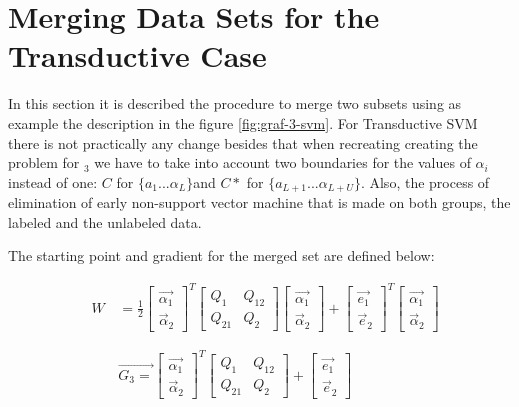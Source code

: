 \section{Merging Data Sets for the Transductive Case}

In this section it is described the procedure to merge two subsets
using as example the description in the figure \ref{fig:graf-3-svm}.
For Transductive SVM there is not practically any change besides that
when recreating creating the problem for $_{3}$ we have
to take into account two boundaries for the values of $\alpha_{i}$
instead of one: $C$ for $\{a_{1}...\alpha_{L}\}$and $C*$ for $\{a_{L+1}...\alpha_{L+U}\}$.
Also, the process of elimination of early non-support vector machine
that is made on both groups, the labeled and the unlabeled data. 

The starting point and gradient for the merged set are defined below:

\begin{eqnarray}
 & W\, & =\frac{1}{2}\left[\begin{array}{c}
\vec{\alpha_{1}}\\
\vec{\alpha}_{2}\end{array}\right]^{T}\left[\begin{array}{cc}
Q_{1} & Q_{12}\\
Q_{21} & Q_{2}\end{array}\right]\left[\begin{array}{c}
\vec{\alpha_{1}}\\
\vec{\alpha}_{2}\end{array}\right]+\left[\begin{array}{c}
\vec{e_{1}}\\
\vec{e}_{2}\end{array}\right]^{T}\left[\begin{array}{c}
\vec{\alpha_{1}}\\
\vec{\alpha}_{2}\end{array}\right]\nonumber \\
\label{eq:mergin-subsets}\\\nonumber \\ &  & \vec{G_{3}=}\left[\begin{array}{c}
\vec{\alpha_{1}}\\
\vec{\alpha}_{2}\end{array}\right]^{T}\left[\begin{array}{cc}
Q_{1} & Q_{12}\\
Q_{21} & Q_{2}\end{array}\right]+\left[\begin{array}{c}
\vec{e_{1}}\\
\vec{e}_{2}\end{array}\right]\nonumber \end{eqnarray}

